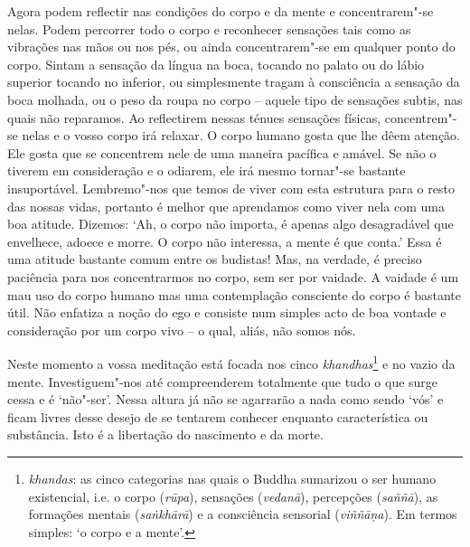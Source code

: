 Agora podem reflectir nas condições do corpo e da mente e
concentrarem"-se nelas. Podem percorrer todo o corpo e reconhecer
sensações tais como as vibrações nas mãos ou nos pés, ou ainda
concentrarem"-se em qualquer ponto do corpo. Sintam a sensação da língua
na boca, tocando no palato ou do lábio superior tocando no inferior, ou
simplesmente tragam à consciência a sensação da boca molhada, ou o peso
da roupa no corpo -- aquele tipo de sensações subtis, nas quais não
reparamos. Ao reflectirem nessas ténues sensações físicas, concentrem"-se
nelas e o vosso corpo irá relaxar. O corpo humano gosta que lhe dêem
atenção. Ele gosta que se concentrem nele de uma maneira pacífica e
amável. Se não o tiverem em consideração e o odiarem, ele irá mesmo 
tornar"-se bastante insuportável. Lembremo"-nos que temos de viver com 
esta estrutura para o resto das nossas vidas, portanto é melhor que
aprendamos como viver nela com uma boa atitude. Dizemos: `Ah, o corpo
não importa, é apenas algo desagradável que envelhece, adoece e morre. O
corpo não interessa, a mente é que conta.' Essa é uma atitude bastante
comum entre os budistas! Mas, na verdade, é preciso paciência para nos
concentrarmos no corpo, sem ser por vaidade. A vaidade é um mau uso do
corpo humano mas uma contemplação consciente do corpo é bastante útil.
Não enfatiza a noção do ego e consiste num simples acto de boa vontade e
consideração por um corpo vivo -- o qual, aliás, não somos nós.

Neste momento a vossa meditação está focada nos cinco
\emph{khandhas}\footnote{%
  \emph{khandas}: as cinco categorias nas quais o Buddha sumarizou o ser humano
  existencial, i.e. o corpo (\emph{rūpa}), sensações (\emph{vedanā}),
  percepções (\emph{saññā}), as formações mentais (\emph{saṅkhārā}) e a
  consciência sensorial (\emph{viññāņa}). Em termos simples: `o corpo e a
  mente'.}
e no vazio da mente. Investiguem"-nos até compreenderem totalmente que tudo
o que surge cessa e é `não"-ser'. Nessa altura já não se agarrarão a nada
como sendo `vós' e ficam livres desse desejo de se tentarem conhecer
enquanto característica ou substância. Isto é a libertação do nascimento e da
morte.


